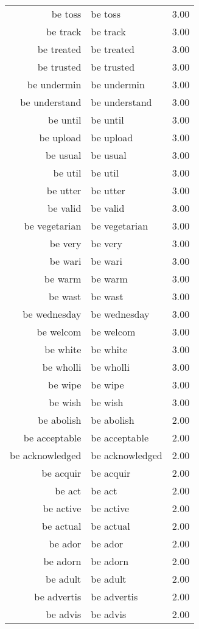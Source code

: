 \begin{table}[ht]
\begin{tabular}{rlr}
  be toss & be toss & 3.00 \\ 
  be track & be track & 3.00 \\ 
  be treated & be treated & 3.00 \\ 
  be trusted & be trusted & 3.00 \\ 
  be undermin & be undermin & 3.00 \\ 
  be understand & be understand & 3.00 \\ 
  be until & be until & 3.00 \\ 
  be upload & be upload & 3.00 \\ 
  be usual & be usual & 3.00 \\ 
  be util & be util & 3.00 \\ 
  be utter & be utter & 3.00 \\ 
  be valid & be valid & 3.00 \\ 
  be vegetarian & be vegetarian & 3.00 \\ 
  be very & be very & 3.00 \\ 
  be wari & be wari & 3.00 \\ 
  be warm & be warm & 3.00 \\ 
  be wast & be wast & 3.00 \\ 
  be wednesday & be wednesday & 3.00 \\ 
  be welcom & be welcom & 3.00 \\ 
  be white & be white & 3.00 \\ 
  be wholli & be wholli & 3.00 \\ 
  be wipe & be wipe & 3.00 \\ 
  be wish & be wish & 3.00 \\ 
  be abolish & be abolish & 2.00 \\ 
  be acceptable & be acceptable & 2.00 \\ 
  be acknowledged & be acknowledged & 2.00 \\ 
  be acquir & be acquir & 2.00 \\ 
  be act & be act & 2.00 \\ 
  be active & be active & 2.00 \\ 
  be actual & be actual & 2.00 \\ 
  be ador & be ador & 2.00 \\ 
  be adorn & be adorn & 2.00 \\ 
  be adult & be adult & 2.00 \\ 
  be advertis & be advertis & 2.00 \\ 
  be advis & be advis & 2.00 \\ 

\end{tabular}
\end{table}
